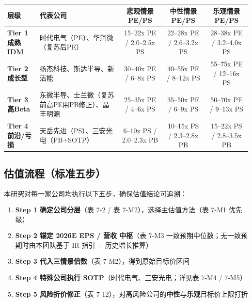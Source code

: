 \begin{exhibitbox}
\centering
\small
\begin{tabularx}{\textwidth}{l >{\hsize=1.3\hsize}X c c c}
\toprule
\textbf{层级} & \textbf{代表公司} & \textbf{悲观情景 PE/PS} & \textbf{中性情景 PE/PS} & \textbf{乐观情景 PE/PS} \\
\midrule
\rowcolor{navy!8}
\textbf{Tier 1 成熟IDM} & 时代电气（PE）、华润微（复苏后PE） & 15–22x PE / 2.0–2.5x PS & 22–28x PE / 2.6–3.2x PS & 28–38x PE / 3.2–4.0x PS \\
\midrule
\rowcolor{accentblue!8}
\textbf{Tier 2 成长型} & 扬杰科技、斯达半导、新洁能 & 30–40x PE / 6–8x PS & 40–55x PE / 8–12x PS & 55–75x PE / 12–16x PS \\
\midrule
\rowcolor{riskamber!8}
\textbf{Tier 3 高Beta} & 东微半导、士兰微（复苏前高PE用PB修正）、晶丰明源 & 25–35x PE / 4–6x PS & 35–50x PE / 6–9x PS & 50–70x PE / 9–13x PS \\
\midrule
\rowcolor{steelgrey!16}
\textbf{Tier 4 前沿/亏损} & 天岳先进（PS）、三安光电（PB+SOTP） & 6–10x PS / 2.0–2.3x PB & 10–15x PS / 2.3–2.8x PB & 15–22x PS / 2.8–3.5x PB \\
\bottomrule
\end{tabularx}
\end{exhibitbox}

\subsection{估值流程（标准五步）}

本研究对每一家公司均执行以下五步，确保估值结论可追溯：

\vspace{0.3em}

\begin{enumerate}[leftmargin=2em]
\item \textbf{Step 1 确定公司分层}（表 7-2 / 表 7-M2），选择主估值方法（表 7-M1 优先级）
\item \textbf{Step 2 锚定 2026E EPS / 营收 中枢}（表 7-M3 一致预期中位数；无一致预期时由本团队基于 IR 指引 + 历史增长推算）
\item \textbf{Step 3 代入三情景倍数}（表 7-M2），得到原始目标价区间
\item \textbf{Step 4 特殊公司执行 SOTP}（时代电气、三安光电；详见表 7-M4 / 7-M5）
\item \textbf{Step 5 风险折价修正}（表 7-12），对高风险公司的\textbf{中性}与\textbf{乐观}目标价上限打折
\end{enumerate}

